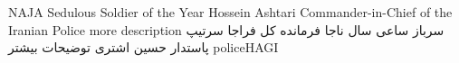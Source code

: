 
\honorsAwardsTitleC
{NAJA Sedulous Soldier of the Year}
{Hossein Ashtari Commander-in-Chief of the Iranian Police}
{more description}
{سرباز ساعی سال ناجا}
{فرمانده کل فراجا سرتیپ پاستدار حسین اشتری}
{توضیحات بیشتر}
{}
{policeHAGI}
